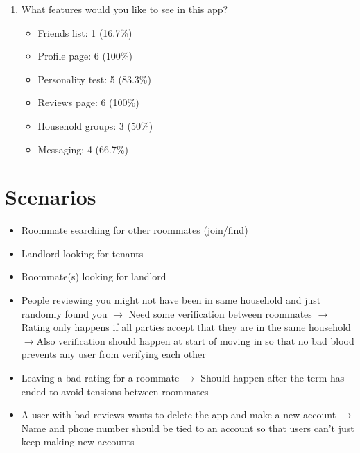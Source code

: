 \documentclass{article}
\begin{document}
\begin{appendices}
\begin{enumerate}
    \medskip
    \item{What features would you like to see in this app?}
    \begin{itemize}
        \item Friends list: 1 (16.7\%)
        \item Profile page: 6 (100\%)
        \item Personality test: 5 (83.3\%)
        \item Reviews page: 6 (100\%)
        \item Household groups: 3 (50\%)
        \item Messaging: 4 (66.7\%)
    \end{itemize}
\end{enumerate}

\newpage
\section{Scenarios}
\begin{itemize}
    \item Roommate searching for other roommates (join/find)

    \item Landlord looking for tenants
   
    \item Roommate(s) looking for landlord
    
    \item People reviewing you might not have been in same household and just randomly found you     
    \newline $\rightarrow{}$ Need some verification between roommates
        \newline $\rightarrow{}$ Rating only happens if all parties accept that they are in the same 
        household
        \newline $\rightarrow{}$Also verification should happen at start of moving in so that no bad 
        blood prevents any user from verifying each other
    
    \item Leaving a bad rating for a roommate
    \newline $\rightarrow{}$ Should happen after the term has ended to avoid tensions between roommates
    
    \item A user with bad reviews wants to delete the app and make a new account
    \newline $\rightarrow{}$ Name and phone number should be tied to an account so that users can’t just 
    keep making new accounts
    

\end{itemize}
\end{appendices}
\end{document}
